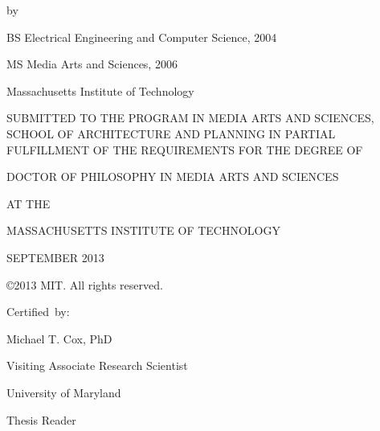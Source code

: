 \thispagestyle{empty}

\cleardoublepage

\begin{addmargin}[1cm]{-2cm}
\begin{center}
    \begingroup
        \color{Maroon}\spacedallcaps{\myTitle}
    \endgroup

    \vspace{2mm}

    by

    \vspace{2mm}

    \myName

    \vspace{6mm}
    
    BS Electrical Engineering and Computer Science, 2004
    
    MS Media Arts and Sciences, 2006

    Massachusetts Institute of Technology
    
    \vspace{6mm}

 SUBMITTED TO THE PROGRAM IN MEDIA ARTS AND SCIENCES, SCHOOL OF
 ARCHITECTURE AND PLANNING IN PARTIAL FULFILLMENT OF THE REQUIREMENTS
 FOR THE DEGREE OF

    \vspace{6mm}

DOCTOR OF PHILOSOPHY IN MEDIA ARTS AND SCIENCES

AT THE

MASSACHUSETTS INSTITUTE OF TECHNOLOGY

    \vspace{6mm}

SEPTEMBER 2013

    \vspace{6mm}

\copyright 2013 MIT.  All rights reserved.

\end{center}        


\begin{flushright}
  \vspace{15mm}

  Certified~by:\hspace{0.5cm}~\makebox[2.75in]{\hrulefill}

Michael T. Cox, PhD

Visiting Associate Research Scientist
                                 
University of Maryland

Thesis Reader

\end{flushright}

\end{addmargin}

